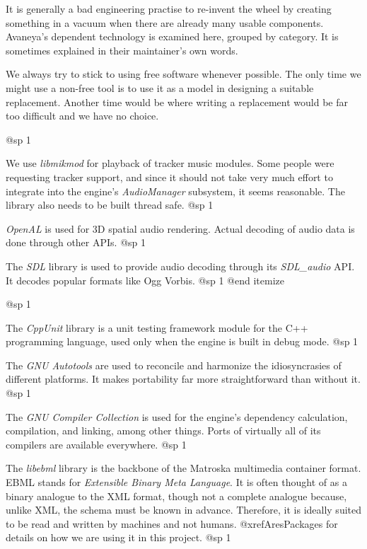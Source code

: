 
It is generally a bad engineering practise to re-invent the wheel by creating something in a vacuum when there are already many usable components. Avaneya's dependent technology is examined here, grouped by category. It is sometimes explained in their maintainer's own words.

We always try to stick to using free software whenever possible. The only time we might use a non-free tool is to use it as a model in designing a suitable replacement. Another time would be where writing a replacement would be far too difficult and we have no choice.

@sp 1

\itemize
\item
We use {\it libmikmod} for playback of tracker music modules. Some people were requesting tracker support, and since it should not take very much effort to integrate into the engine's {\it AudioManager} subsystem, it seems reasonable. The library also needs to be built thread safe.
@sp 1

\item
{\it OpenAL} is used for 3D spatial audio rendering. Actual decoding of audio data is done through other APIs.
@sp 1

\item
The {\it SDL} library is used to provide audio decoding through its {\it SDL_audio} API. It decodes popular formats like Ogg Vorbis.
@sp 1
@end itemize

@sp 1

\itemize
\item
The {\it CppUnit} library is a unit testing framework module for the C++ programming language, used only when the engine is built in debug mode.
@sp 1

\item
The {\it GNU Autotools} are used to reconcile and harmonize the idiosyncrasies of different platforms. It makes portability far more straightforward than without it.
@sp 1

\item
The {\it GNU Compiler Collection} is used for the engine's dependency calculation, compilation, and linking, among other things. Ports of virtually all of its compilers are available everywhere.
@sp 1

\item
The {\it libebml} library is the backbone of the Matroska multimedia container format. EBML stands for {\it Extensible Binary Meta Language}. It is often thought of as a binary analogue to the XML format, though not a complete analogue because, unlike XML, the schema must be known in advance. Therefore, it is ideally suited to be read and written by machines and not humans. @xref{AresPackages} for details on how we are using it in this project.
@sp 1

